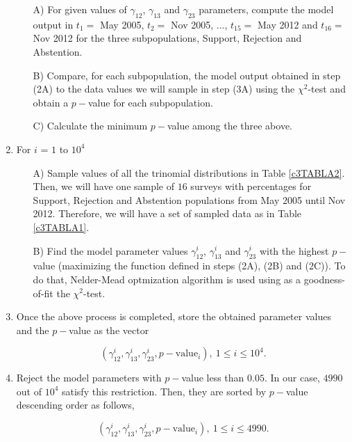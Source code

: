 \begin{enumerate}
\begin{itemize}
\item[A)] For given values of $\gamma_{12}$, $\gamma_{13}$ and $\gamma_{23}$ parameters, compute the model output in $t_1=$ May 2005, $t_2=$ Nov 2005, ..., $t_{15}=$ May 2012 and $t_{16}=$ Nov 2012 for the three subpopulations, Support, Rejection and Abstention.
\item[B)] Compare, for each subpopulation, the model output obtained in step (2A) to the data values we will sample in step (3A) using the $\chi^2$-test and obtain a $p-$value for each subpopulation.
\item[C)] Calculate the minimum $p-$value among the three above.
\end{itemize}

\item For $i$ = $1$ to $10^4$

\begin{itemize}
\item[A)] Sample values of all the trinomial distributions in Table \ref{c3TABLA2}. Then, we will have one sample of $16$ surveys with percentages for Support, Rejection and Abstention populations from May 2005 until Nov 2012. Therefore, we will have a set of sampled data as in Table \ref{c3TABLA1}.
 
\item[B)] Find the model parameter values $\gamma_{12}^i$, $\gamma_{13}^i$ and $\gamma_{23}^i$ with the highest $p-$value (maximizing the function defined in steps (2A), (2B) and (2C)). To do that, Nelder-Mead optmization algorithm is used \cite{Nelder, Press} using as a goodness-of-fit the $\chi^2$-test.

\end{itemize}

\item Once the above process is completed, store the obtained parameter values and the $p-$value as the vector     

\[
 ( \gamma_{12}^i, \gamma_{13}^i, \gamma_{23}^i, p-\mbox{value}_i ), \ 1 \leq i \leq 10^4.
\]

\item Reject the model parameters with $p-$value less than $0.05$. In our case, $4990$ out of $10^4$ satisfy this restriction. Then, they are sorted by $p-$value descending order as follows,

\begin{equation}
 ( \gamma_{12}^i, \gamma_{13}^i, \gamma_{23}^i, p-\mbox{value}_i ), \ 1 \leq i \leq 4990. \label{3BF}
\end{equation}


\end{enumerate}
